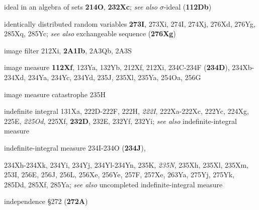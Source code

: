 \indexmedskip

ideal in an algebra of sets {\bf 214O}, {\bf 232Xc};  
  {\it see also} $\sigma$-ideal ({\bf 112Db})













identically distributed random variables {\bf 273I}, 273Xi,
274I, 274Xj, 276Xd, 276Yg, 285Xq, 285Yc;  
  {\it see also} exchangeable sequence ({\bf 276Xg})




image filter 212Xi, {\bf 2A1Ib}, 2A3Qb, 2A3S


image measure {\bf 112Xf}, 123Ya, 132Yb,
  212Xf, 212Xi,
234C-234F ({\bf 234D}), 
234Xb-234Xd, 
234Ya, 234Yc, 234Yd, 235J, 235Xl,
235Ya, 254Oa, 256G


image measure catastrophe 235H






























indefinite integral 131Xa,
  222D-222F, 
222H, {\it 222I}, 222Xa-222Xc, 
222Yc, 224Xg, 225E, {\it 225Od}, 225Xf, {\bf 232D}, 232E, 232Yf, 232Yi;
  {\it see also }
indefinite-integral measure
  

indefinite-integral measure 234I-234O ({\bf 234J}),
  
234Xh-234Xk, 
234Yi, 234Yj, 234Yl-234Yn, 
235K, {\it 235N}, 235Xh, 235Xl, 235Xm,
253I, 256E, 256J, 256L, 256Xe, 256Ye, 257F, 257Xe, 263Ya, 275Yj, 275Yk,
285Dd, 285Xf, 285Ya;
  {\it see also} uncompleted indefinite-integral measure


independence \S272 ({\bf 272A})










